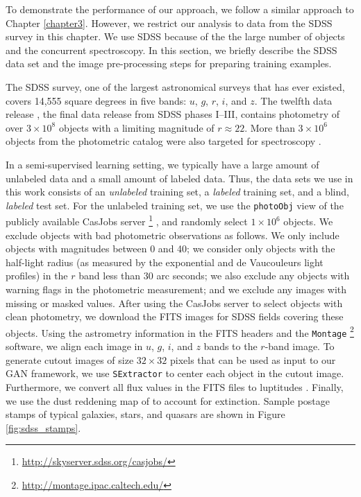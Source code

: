  
To demonstrate the performance of our approach, we follow a similar approach to Chapter \ref{chapter3}.
However, we restrict our analysis to data from the SDSS survey in this chapter.
We use SDSS because of the the large number of objects and the concurrent spectroscopy.
In this section, we briefly describe the SDSS data set and the image pre-processing steps for
preparing training examples.

The SDSS survey, one of the largest astronomical surveys that has ever existed,
covers 14,555 square degrees in five bands: $u$, $g$, $r$, $i$, and $z$.
The twelfth data release \citep{alam2015eleventh}, the final data release from SDSS phases I--III,
contains photometry of over $3 \times 10^8$ objects with a limiting magnitude of $r \approx 22$.
More than $3 \times 10^6$ objects from the photometric catalog were also targeted for spectroscopy \citep{eisenstein2011sdss}.

In a semi-supervised learning setting, we typically have a large amount of unlabeled data
and a small amount of labeled data.
Thus, the data sets we use in this work consists of an \emph{unlabeled} training set,
a \emph{labeled} training set, and a blind, \emph{labeled} test set.
For the unlabeled training set, we use the \texttt{photoObj} view of the publicly available CasJobs server \footnote{\url{http://skyserver.sdss.org/casjobs/}} \citep{li2008casjobs},
and randomly select $1 \times 10^6$ objects.
We exclude objects with bad photometric observations as follows.
We only include objects with magnitudes between 0 and 40;
we consider only objects with the half-light radius (as measured by the exponential and de Vaucouleurs light profiles)
in the $r$ band less than 30 arc seconds;
we also exclude any objects with warning flags in the photometric measurement;
and we exclude any images with missing or masked values.
After using the CasJobs server to select objects with clean photometry,
we download the FITS images for SDSS fields covering these objects.
Using the astrometry information in the FITS headers and the \texttt{Montage} \footnote{\url{http://montage.ipac.caltech.edu/}} software,
we align each image in $u$, $g$, $i$, and $z$ bands to the $r$-band image.
To generate cutout images of size $32 \times 32$ pixels that can be used as input to our GAN framework,
we use \texttt{SExtractor} to center each object in the cutout image.
Furthermore, we convert all flux values in the FITS files to luptitudes
\citep[\ie inverse hyperbolic sine magnitudes;][]{lupton1999modified}.
Finally, we use the dust reddening map of \citet{schlegel1998maps} to account for extinction.
Sample postage stamps of typical galaxies, stars, and quasars are shown in Figure \ref{fig:sdss_stamps}.

